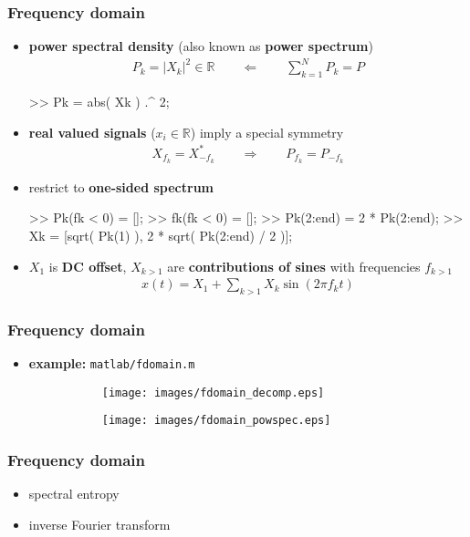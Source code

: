 \begin{frame}[fragile]
	\frametitle{Frequency domain}
	\begin{itemize}
		\item \textbf{power spectral density} (also known as \textbf{power spectrum})
			\begin{align*}
				P_k=\lvert X_k\rvert^2\in\mathbb R\qquad\Leftarrow\qquad\sum_{k=1}^NP_k=P
			\end{align*}
			\begin{code}
>> Pk = abs( Xk ) .^ 2; \color{medium}%
			\end{code}
		\item \textbf{real valued signals} ($x_i\in\mathbb R$) imply a special symmetry
			\begin{align*}
				X_{f_k}=X_{-f_k}^*\qquad\Rightarrow\qquad P_{f_k}=P_{-f_k}
			\end{align*}
		\item restrict to \textbf{one-sided spectrum}
			\begin{code}
>> Pk(fk < 0) = []; \color{medium}%
>> fk(fk < 0) = [];
>> Pk(2:end) = 2 * Pk(2:end); \color{medium}%
>> Xk = [sqrt( Pk(1) ), 2 * sqrt( Pk(2:end) / 2 )];
			\end{code}
		\item $X_1$ is \textbf{DC offset}, $X_{k>1}$ are \textbf{contributions of sines} with frequencies $f_{k>1}$
			\begin{align*}
				x(t)=X_1+\sum_{k>1}X_k\sin(2\pi f_kt)
			\end{align*}
	\end{itemize}
\end{frame}

\begin{frame}
	\frametitle{Frequency domain}
	\begin{itemize}
		\item \textbf{example:} \texttt{matlab/fdomain.m}
			\begin{figure}
				\centering
				\begin{subfigure}[c]{0.48\linewidth}
					\texttt{[image: images/fdomain\_decomp.eps]}
				\end{subfigure}
				\hspace{0.01\linewidth}
				\begin{subfigure}[c]{0.48\linewidth}
					\texttt{[image: images/fdomain\_powspec.eps]}
				\end{subfigure}
			\end{figure}
	\end{itemize}
\end{frame}

\begin{frame}
	\frametitle{Frequency domain}
	\begin{itemize}
		\item spectral entropy
		\item inverse Fourier transform
	\end{itemize}
\end{frame}

